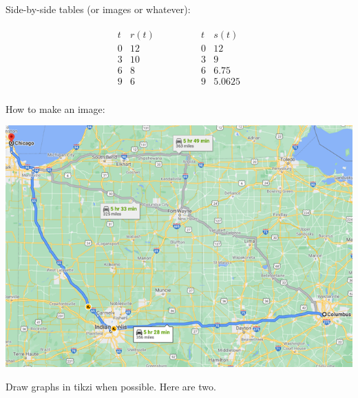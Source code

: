 \documentclass[nooutcomes]{ximera}
\begin{document}
Side-by-side tables (or images or whatever):


\[
\begin{array}{cccccc}
{\begin{array}{cc}
t&r(t)\\
\hline
0&12\\
3&10\\
6&8\\
9&6
\end{array}}&&&&&
{\begin{array}{cc}
t&s(t)\\
\hline
0&12\\
3&9\\
6&6.75\\
9&5.0625
\end{array}}\\
\end{array}
\]


How to make an image:
\begin{image}
\includegraphics{ColumbusChicago.png}
\end{image}


Draw graphs in tikzi when possible.  Here are two.

\begin{image}
\end{image}
\end{document}
